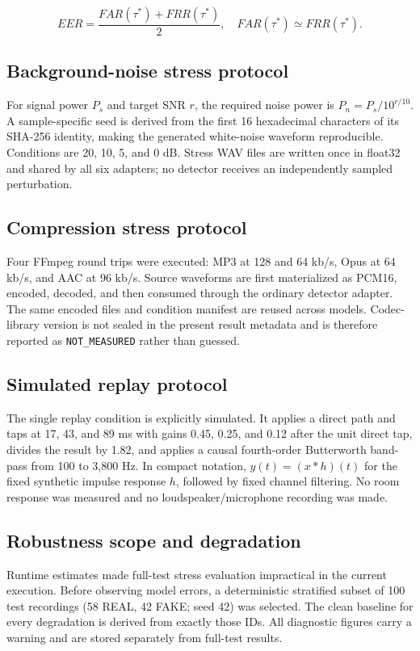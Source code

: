 \documentclass[10pt,journal]{IEEEtran}
\begin{document}
\begin{equation}
EER=\frac{FAR(\tau^*)+FRR(\tau^*)}{2},\quad FAR(\tau^*)\simeq FRR(\tau^*).
\end{equation}
\subsection{Background-noise stress protocol}
For signal power $P_s$ and target SNR $r$, the required noise power is $P_n=P_s/10^{r/10}$. A sample-specific seed is derived from the first 16 hexadecimal characters of its SHA-256 identity, making the generated white-noise waveform reproducible. Conditions are 20, 10, 5, and 0 dB. Stress WAV files are written once in float32 and shared by all six adapters; no detector receives an independently sampled perturbation.

\subsection{Compression stress protocol}
Four FFmpeg round trips were executed: MP3 at 128 and 64 kb/s, Opus at 64 kb/s, and AAC at 96 kb/s. Source waveforms are first materialized as PCM16, encoded, decoded, and then consumed through the ordinary detector adapter. The same encoded files and condition manifest are reused across models. Codec-library version is not sealed in the present result metadata and is therefore reported as \texttt{NOT\_MEASURED} rather than guessed.

\subsection{Simulated replay protocol}
The single replay condition is explicitly simulated. It applies a direct path and taps at 17, 43, and 89 ms with gains 0.45, 0.25, and 0.12 after the unit direct tap, divides the result by 1.82, and applies a causal fourth-order Butterworth band-pass from 100 to 3,800 Hz. In compact notation, $y(t)=(x*h)(t)$ for the fixed synthetic impulse response $h$, followed by fixed channel filtering. No room response was measured and no loudspeaker/microphone recording was made.

\subsection{Robustness scope and degradation}
Runtime estimates made full-test stress evaluation impractical in the current execution. Before observing model errors, a deterministic stratified subset of 100 test recordings (58 REAL, 42 FAKE; seed 42) was selected. The clean baseline for every degradation is derived from exactly those IDs. All diagnostic figures carry a warning and are stored separately from full-test results.
\end{document}
